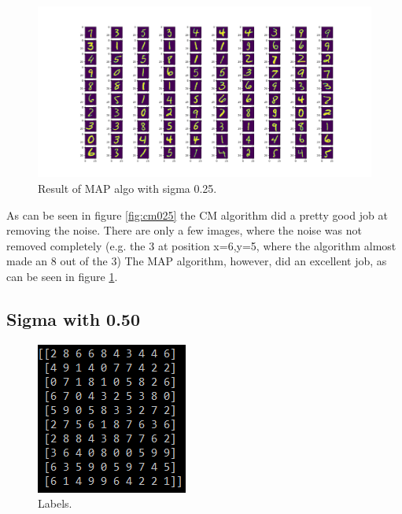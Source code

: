 \documentclass{article}
\begin{document}
\begin{figure}[h]
  \includegraphics[width=\linewidth]{sigma_025_map.png}
  \caption{Result of MAP algo with sigma 0.25.}
  \label{fig:map025}
\end{figure}
As can be seen in figure \ref{fig:cm025} the CM algorithm did a pretty good job at removing the noise. There are only a few images, where the noise was not removed completely (e.g. the 3 at position x=6,y=5, where the algorithm almost made an 8 out of the 3) The MAP algorithm, however, did an excellent job, as can be seen in figure \ref{fig:map025}.
\pagebreak

\subsection{Sigma with 0.50}
\begin{figure}[!h]
  \includegraphics[width=\linewidth]{sigma_050_sol.png}
  \caption{Labels.}
  \label{fig:sol050}
\end{figure}
\end{document}
